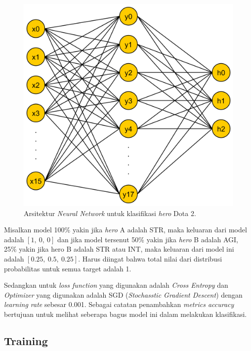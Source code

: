 \begin{figure} [!h] \centering
	\includegraphics[scale=0.08]{img/nn_dota2.png}
	\caption{Arsitektur \textit{Neural Network} untuk klasifikasi \textit{hero} Dota 2.}
	\label{fig:nn_dota2}
\end{figure}

Misalkan model 100\% yakin jika \textit{hero} A adalah STR, maka keluaran dari model adalah $\left[1,\ 0,\ 0 \right]$ dan jika model tersenut 50\% yakin jika \textit{hero} B adalah AGI, 25\% yakin jika hero B adalah STR atau INT, maka keluaran dari model ini adalah $\left[0.25,\ 0.5,\ 0.25 \right]$. Harus diingat bahwa total nilai dari distribusi probabilitas untuk semua target adalah 1.
\vspace{1ex}

Sedangkan untuk \textit{loss function} yang digunakan adalah \textit{Cross Entropy} dan \textit{Optimizer} yang digunakan adalah SGD (\textit{Stochasstic Gradient Descent}) dengan \textit{learning rate} sebesar 0.001. Sebagai catatan penambahkan \textit{metrics accuracy} bertujuan untuk melihat seberapa bagus model ini dalam melakukan klasifikasi.
\vspace{1ex}

\subsection{Training}
\label{sec:sub_sec3_dota2_train}
\vspace{1ex}

